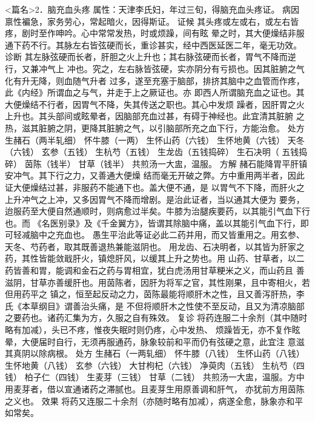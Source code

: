 \documentclass[a4paper,12pt,UTF8,twoside]{ctexbook}
\begin{document}
<篇名>2．脑充血头疼
属性：天津李氏妇，年过三旬，得脑充血头疼证。 
病因 禀性褊急，家务劳心，常起暗火，因得斯证。 
证候 其头疼或左或右，或左右皆疼，剧时至作呻吟。心中常常发热，时或烦躁，间有眩 
晕之时，其大便燥结非服通下药不行。其脉左右皆弦硬而长，重诊甚实，经中西医延医二年，毫无功效。 
诊断 其左脉弦硬而长者，肝胆之火上升也；其右脉弦硬而长者，胃气不降而逆行，又兼冲气上 
冲也。究之，左右脉皆弦硬，实亦阴分有亏损也。因其脏腑之气化有升无降，则血随气升者 
过多，遂至充塞于脑部，排挤其脑中之血管而作疼，此《内经》所谓血之与气，并走于上之厥证也。亦 
即西人所谓脑充血之证也。其大便燥结不行者，因胃气不降，失其传送之职也。其心中发烦 
躁者，因肝胃之火上升也。其头部间或眩晕者，因脑部充血过甚，有碍于神经也。此宜清其脏腑 
之热，滋其脏腑之阴，更降其脏腑之气，以引脑部所充之血下行，方能治愈。 
处方 生赭石（两半轧细） 怀牛膝（一两） 生怀山药（六钱） 生怀地黄（六钱） 
天冬（六钱） 玄参（五钱） 生杭芍（五钱） 生龙齿（五钱捣碎） 生石决明（ 
五钱捣碎） 茵陈（钱半） 甘草（钱半） 
共煎汤一大盅，温服。 
方解 赭石能降胃平肝镇安冲气。其下行之力，又善通大便燥 
结而毫无开破之弊。方中重用两半者，因此证大便燥结过甚，非服药不能通下也。盖大便不通，是 
以胃气不下降，而肝火之上升冲气之上冲，又多因胃气不降而增剧。是治此证者，当以通其大便为 
要务，迨服药至大便自然通顺时，则病愈过半矣。牛膝为治腿疾要药，以其能引气血下行也。而 
《名医别录》及《千金翼方》，皆谓其除脑中痛，盖以其能引气血下行，即可轻减脑中之充血也。 
愚生平治此等证必此二药并用，而又皆重用之。用玄参、天冬、芍药者，取其既善退热兼能滋阴也。 
用龙齿、石决明者，以其皆为肝家之药，其性皆能敛戢肝火，镇熄肝风，以缓其上升之势也。用 
山药、甘草者，以二药皆善和胃，能调和金石之药与胃相宜，犹白虎汤用甘草粳米之义，而山药且 
善滋阴，甘草亦善缓肝也。用茵陈者，因肝为将军之官，其性刚果，且中寄相火，若但用药平之 
镇之，恒至起反动之力，茵陈最能将顺肝木之性，且又善泻肝热，李氏《本草纲目》谓善治头痛，是 
不但将顺肝木之性使不至反动，且又为清凉脑部之要药也。诸药汇集为方，久服之自有殊效。 
复诊 将药连服二十余剂（其中随时略有加减），头已不疼，惟夜失眠时则仍疼，心中发热、 
烦躁皆无，亦不复作眩晕，大便届时自行，无须再服通药，脉象较前和平而仍有弦硬之意，此宜注 
意滋其真阴以除病根。 
处方 生赭石（一两轧细） 怀牛膝（八钱） 生怀山药（八钱） 生怀地黄（八钱） 
玄参（六钱） 大甘枸杞（六钱） 净萸肉（五钱） 生杭芍（四钱） 
柏子仁（四钱） 生麦芽（三钱） 甘草（二钱） 
共煎汤一大盅，温服。方中用麦芽者，借以宣通诸药之滞腻也。且麦芽生用原善调和肝气， 
亦犹前方用茵陈之义也。 
效果 将药又连服二十余剂（亦随时略有加减），病遂全愈，脉象亦和平如常矣。 
\end{document}

